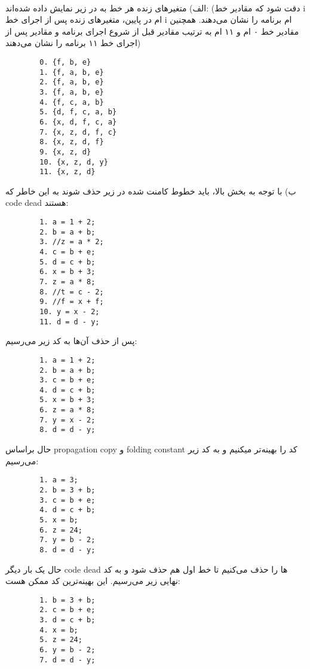 \\
الف) متغیرهای زنده هر خط به در زیر نمایش داده شده‌اند: (دقت شود که مقادیر خط i ام در پایین، متغیرهای زنده پس از اجرای خط i ام برنامه را نشان می‌دهند. همچنین مقادیر خط ۰ ام و ۱۱ ام به ترتیب مقادیر قبل از شروع اجرای برنامه و مقادیر پس از اجرای خط ۱۱ برنامه را نشان می‌دهند)
\begin{latin}
	\begin{verbatim}
		0. {f, b, e}
		1. {f, a, b, e}
		2. {f, a, b, e}
		3. {f, a, b, e}
		4. {f, c, a, b}
		5. {d, f, c, a, b}
		6. {x, d, f, c, a}
		7. {x, z, d, f, c}
		8. {x, z, d, f}
		9. {x, z, d}
		10. {x, z, d, y}
		11. {x, z, d}
	\end{verbatim}
\end{latin}
ب) با توجه به بخش بالا، باید خطوط کامنت شده در زیر حذف شوند به این خاطر که code dead هستند:
\begin{latin}
	\begin{verbatim}
		1. a = 1 + 2;
		2. b = a + b;
		3. //z = a * 2;
		4. c = b + e;
		5. d = c + b;
		6. x = b + 3;
		7. z = a * 8;
		8. //t = c - 2;
		9. //f = x + f;
		10. y = x - 2;
		11. d = d - y;
	\end{verbatim}
\end{latin}
پس از حذف آن‌ها به کد زیر می‌رسیم:
\begin{latin}
	\begin{verbatim}
		1. a = 1 + 2;
		2. b = a + b;
		3. c = b + e;
		4. d = c + b;
		5. x = b + 3;
		6. z = a * 8;
		7. y = x - 2;
		8. d = d - y;
	\end{verbatim}
\end{latin}
حال براساس propagation copy و folding constant کد را بهینه‌تر میکنیم و به کد زیر می‌رسیم:
\begin{latin}
	\begin{verbatim}
		1. a = 3;
		2. b = 3 + b;
		3. c = b + e;
		4. d = c + b;
		5. x = b;
		6. z = 24;
		7. y = b - 2;
		8. d = d - y;
	\end{verbatim}
\end{latin}
حال یک بار دیگر code dead ها را حذف می‌کنیم تا خط اول هم حذف شود و به کد نهایی زیر می‌رسیم. این بهینه‌ترین کد ممکن هست:
\begin{latin}
	\begin{verbatim}
		1. b = 3 + b;
		2. c = b + e;
		3. d = c + b;
		4. x = b;
		5. z = 24;
		6. y = b - 2;
		7. d = d - y;
	\end{verbatim}
\end{latin}
















